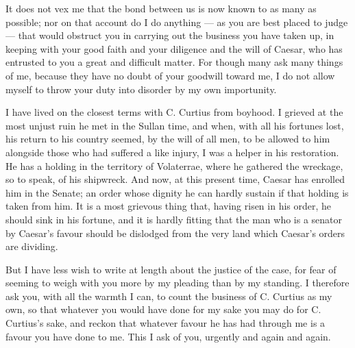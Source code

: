 

 It does not vex me that the bond between us is now known to as many as possible; nor on that account do I do anything --- as you are best placed to judge --- that would obstruct you in carrying out the business you have taken up, in keeping with your good faith and your diligence and the will of Caesar, who has entrusted to you a great and difficult matter. For though many ask many things of me, because they have no doubt of your goodwill toward me, I do not allow myself to throw your duty into disorder by my own importunity.

 I have lived on the closest terms with C. Curtius from boyhood. I grieved at the most unjust ruin he met in the Sullan time, and when, with all his fortunes lost, his return to his country seemed, by the will of all men, to be allowed to him alongside those who had suffered a like injury, I was a helper in his restoration. He has a holding in the territory of Volaterrae, where he gathered the wreckage, so to speak, of his shipwreck. And now, at this present time, Caesar has enrolled him in the Senate; an order whose dignity he can hardly sustain if that holding is taken from him. It is a most grievous thing that, having risen in his order, he should sink in his fortune, and it is hardly fitting that the man who is a senator by Caesar's favour should be dislodged from the very land which Caesar's orders are dividing.

 But I have less wish to write at length about the justice of the case, for fear of seeming to weigh with you more by my pleading than by my standing. I therefore ask you, with all the warmth I can, to count the business of C. Curtius as my own, so that whatever you would have done for my sake you may do for C. Curtius's sake, and reckon that whatever favour he has had through me is a favour you have done to me. This I ask of you, urgently and again and again.

